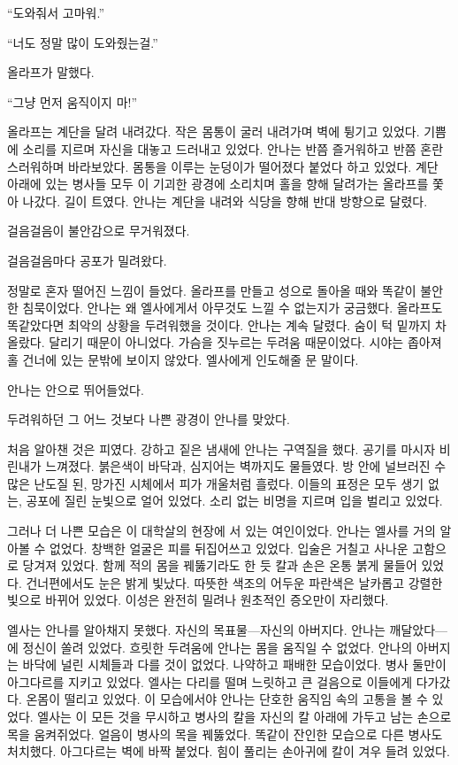 ``도와줘서 고마워.''

``너도 정말 많이 도와줬는걸.''

올라프가 말했다.

``그냥 먼저 움직이지 마!''

올라프는 계단을 달려 내려갔다. 작은 몸통이 굴러 내려가며 벽에 튕기고 있었다. 기쁨에 소리를 지르며 자신을 대놓고 드러내고 있었다. 안나는 반쯤 즐거워하고 반쯤 혼란스러워하며 바라보았다. 몸통을 이루는 눈덩이가 떨어졌다 붙었다 하고 있었다. 계단 아래에 있는 병사들 모두 이 기괴한 광경에 소리치며 홀을 향해 달려가는 올라프를 쫓아 나갔다. 길이 트였다. 안나는 계단을 내려와 식당을 향해 반대 방향으로 달렸다.

걸음걸음이 불안감으로 무거워졌다.

걸음걸음마다 공포가 밀려왔다.

정말로 혼자 떨어진 느낌이 들었다. 올라프를 만들고 성으로 돌아올 때와 똑같이 불안한 침묵이었다. 안나는 왜 엘사에게서 아무것도 느낄 수 없는지가 궁금했다. 올라프도 똑같았다면 최악의 상황을 두려워했을 것이다. 안나는 계속 달렸다. 숨이 턱 밑까지 차올랐다. 달리기 때문이 아니었다. 가슴을 짓누르는 두려움 때문이었다. 시야는 좁아져 홀 건너에 있는 문밖에 보이지 않았다. 엘사에게 인도해줄 문 말이다.

안나는 안으로 뛰어들었다.

두려워하던 그 어느 것보다 나쁜 광경이 안나를 맞았다.

처음 알아챈 것은 피였다. 강하고 짙은 냄새에 안나는 구역질을 했다. 공기를 마시자 비린내가 느껴졌다. 붉은색이 바닥과, 심지어는 벽까지도 물들였다. 방 안에 널브러진 수많은 난도질 된, 망가진 시체에서 피가 개울처럼 흘렀다. 이들의 표정은 모두 생기 없는, 공포에 질린 눈빛으로 얼어 있었다. 소리 없는 비명을 지르며 입을 벌리고 있었다.

그러나 더 나쁜 모습은 이 대학살의 현장에 서 있는 여인이었다. 안나는 엘사를 거의 알아볼 수 없었다. 창백한 얼굴은 피를 뒤집어쓰고 있었다. 입술은 거칠고 사나운 고함으로 당겨져 있었다. 함께 적의 몸을 꿰뚫기라도 한 듯 칼과 손은 온통 붉게 물들어 있었다. 건너편에서도 눈은 밝게 빛났다. 따뜻한 색조의 어두운 파란색은 날카롭고 강렬한 빛으로 바뀌어 있었다. 이성은 완전히 밀려나 원초적인 증오만이 자리했다.

엘사는 안나를 알아채지 못했다. 자신의 목표물—자신의 아버지다. 안나는 깨달았다—에 정신이 쏠려 있었다. 흐릿한 두려움에 안나는 몸을 움직일 수 없었다. 안나의 아버지는 바닥에 널린 시체들과 다를 것이 없었다. 나약하고 패배한 모습이었다. 병사 둘만이 아그다르를 지키고 있었다. 엘사는 다리를 떨며 느릿하고 큰 걸음으로 이들에게 다가갔다. 온몸이 떨리고 있었다. 이 모습에서야 안나는 단호한 움직임 속의 고통을 볼 수 있었다. 엘사는 이 모든 것을 무시하고 병사의 칼을 자신의 칼 아래에 가두고 남는 손으로 목을 움켜쥐었다. 얼음이 병사의 목을 꿰뚫었다. 똑같이 잔인한 모습으로 다른 병사도 처치했다. 아그다르는 벽에 바짝 붙었다. 힘이 풀리는 손아귀에 칼이 겨우 들려 있었다.

